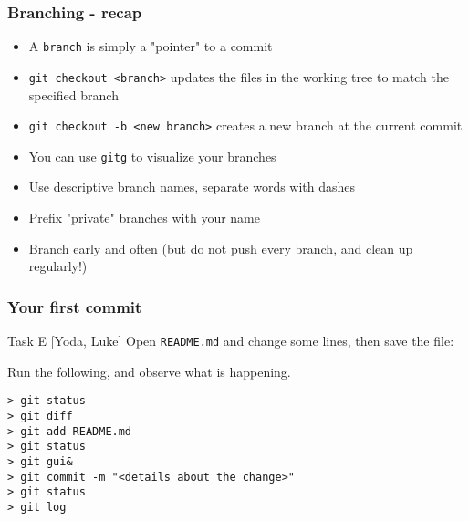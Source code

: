 

\begin{frame}[fragile]

\frametitle{Branching - recap}

\begin{itemize}
\item A \texttt{branch} is simply a "pointer" to a commit
\item \texttt{git checkout <branch>} updates the files in the working tree to match the specified branch
\item \texttt{git checkout -b <new branch>} creates a new branch at the current commit
\item You can use \texttt{gitg} to visualize your branches
\item Use descriptive branch names, separate words with dashes
\item Prefix "private" branches with your name
\item Branch early and often (but do not push every branch, and clean up regularly!)
\end{itemize}	
	
\end{frame}




\begin{frame}[fragile]
	\frametitle{Your first commit}
	
	\begin{block}{Task E [Yoda, Luke]}
	Open \texttt{README.md} and change some lines, then save the file:

Run the following, and observe what is happening.

	\begin{verbatim}
> git status
> git diff
> git add README.md
> git status
> git gui&
> git commit -m "<details about the change>"
> git status
> git log
	\end{verbatim}
	
	\end{block}
	
\end{frame}



